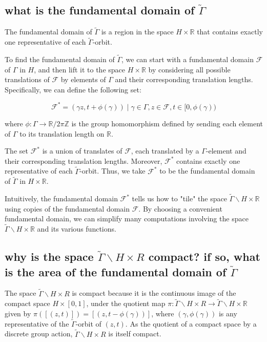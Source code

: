 \documentclass[12pt,a4paper,english]{article}
\theoremstyle{plain}
\theoremstyle{definition}
\theoremstyle{remark}
\begin{document}
\subsection{what is the fundamental domain of $\tilde{\Gamma}$}
The fundamental domain of $\tilde{\Gamma}$ is a region in the space $H \times \mathbb{R}$ that contains exactly one representative of each $\tilde{\Gamma}$-orbit.

To find the fundamental domain of $\tilde{\Gamma}$, we can start with a fundamental domain $\mathcal{F}$ of $\Gamma$ in $H$, and then lift it to the space $H \times \mathbb{R}$ by considering all possible translations of $\mathcal{F}$ by elements of $\Gamma$ and their corresponding translation lengths. Specifically, we can define the following set:

$$\mathcal{F}^\ast = {(\gamma z, t+\phi(\gamma)) \mid \gamma \in \Gamma, z \in \mathcal{F}, t \in [0, \phi(\gamma))}$$

where $\phi:\Gamma\rightarrow \mathbb{R}/2\pi\mathbb{Z}$ is the group homomorphism defined by sending each element of $\Gamma$ to its translation length on $\mathbb{R}$.

The set $\mathcal{F}^\ast$ is a union of translates of $\mathcal{F}$, each translated by a $\Gamma$-element and their corresponding translation lengths. Moreover, $\mathcal{F}^\ast$ contains exactly one representative of each $\tilde{\Gamma}$-orbit. Thus, we take $\mathcal{F}^\ast$ to be the fundamental domain of $\tilde{\Gamma}$ in $H \times \mathbb{R}$.

Intuitively, the fundamental domain $\mathcal{F}^\ast$ tells us how to "tile" the space $\tilde{\Gamma}\backslash H \times \mathbb{R}$ using copies of the fundamental domain $\mathcal{F}$. By choosing a convenient fundamental domain, we can simplify many computations involving the space $\tilde{\Gamma}\backslash H \times \mathbb{R}$ and its various functions.


\subsection{
why is the space $\tilde{\Gamma}\backslash H\times R$ compact? if so, what is the area of the fundamental domain of $\tilde{\Gamma}$}
The space $\tilde{\Gamma}\backslash H \times R$ is compact because it is the continuous image of the compact space $H \times [0,1]$, under the quotient map $\pi:\tilde{\Gamma}\backslash H \times R \to \tilde{\Gamma}\backslash H \times \mathbb{R}$ given by $\pi([(z,t)]) = [(z,t-\phi(\gamma))]$, where $(\gamma,\phi(\gamma))$ is any representative of the $\tilde{\Gamma}$-orbit of $(z,t)$. As the quotient of a compact space by a discrete group action, $\tilde{\Gamma}\backslash H \times R$ is itself compact.
\end{document}
